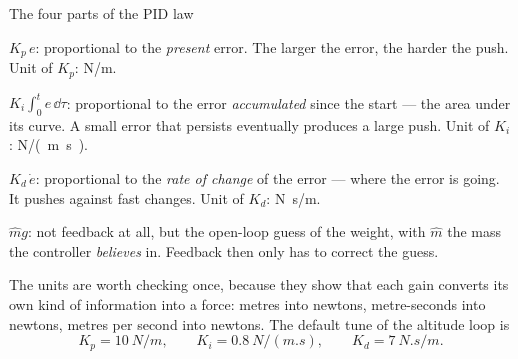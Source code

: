 \begin{definition}{The four parts of the PID law}
\begin{description}[leftmargin=0pt, itemsep=3pt, font=\sffamily\small\bfseries]
  \item[\Pt — proportional.] $K_p\,e$: proportional to the \emph{present} error. The larger the error, the harder the push. Unit of $K_p$: \si{N/m}.
  \item[\It — integral.] $K_i\int_0^t e\,\dd\tau$: proportional to the error \emph{accumulated} since the start — the area under its curve. A small error that persists eventually produces a large push. Unit of $K_i$: \si{N/(m.s)}.
  \item[\Dt — derivative.] $K_d\,\dot e$: proportional to the \emph{rate of change} of the error — where the error is going. It pushes against fast changes. Unit of $K_d$: \si{N.s/m}.
  \item[\FFt — feedforward.] $\hat m g$: not feedback at all, but the open-loop guess of the weight, with $\hat m$ the mass the controller \emph{believes} in. Feedback then only has to correct the guess.
\end{description}
\end{definition}

The units are worth checking once, because they show that each gain converts its own kind of information into a force: metres into newtons, metre-seconds into newtons, metres per second into newtons. The default tune of the altitude loop is
\begin{equation}
  K_p = \SI{10}{N/m},\qquad K_i = \SI{0.8}{N/(m.s)},\qquad K_d = \SI{7}{N.s/m}.
\end{equation}

